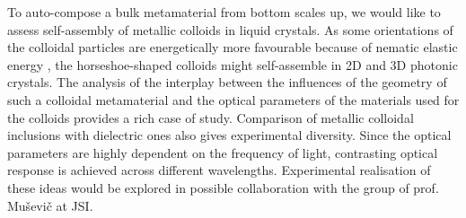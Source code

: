 \documentclass[a4paper,11pt]{article}
\begin{document}



To auto-compose a bulk metamaterial from bottom scales up, we would like to assess self-assembly of metallic colloids in liquid crystals.
As some orientations of the colloidal particles are energetically more favourable because of nematic elastic energy \cite{smalyukh-2009-assembly,musevic-2013-assembly}, the horseshoe-shaped colloids might self-assemble in 2D and 3D photonic crystals. 
The analysis of the interplay between the influences of the geometry of such a colloidal metamaterial and the optical parameters of the materials used for the colloids provides a rich case of study. 
Comparison of metallic colloidal inclusions with dielectric ones also gives experimental diversity. 
Since the optical parameters are highly dependent on the frequency of light, contrasting optical response is achieved across different wavelengths. 
Experimental realisation of these ideas would be explored in possible collaboration with the group of prof. Muševič at JSI. 

\end{document}
